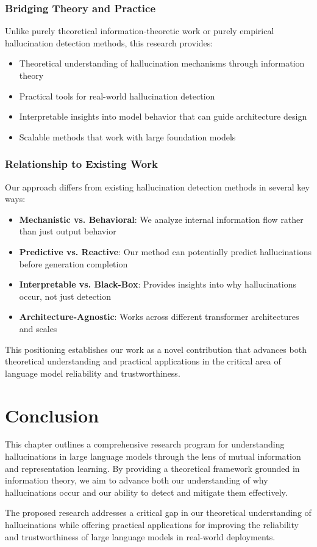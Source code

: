 \subsubsection{Bridging Theory and Practice}
Unlike purely theoretical information-theoretic work or purely empirical hallucination detection methods, this research provides:
\begin{itemize}
    \item Theoretical understanding of hallucination mechanisms through information theory
    \item Practical tools for real-world hallucination detection
    \item Interpretable insights into model behavior that can guide architecture design
    \item Scalable methods that work with large foundation models
\end{itemize}

\subsubsection{Relationship to Existing Work}
Our approach differs from existing hallucination detection methods in several key ways:
\begin{itemize}
    \item \textbf{Mechanistic vs. Behavioral}: We analyze internal information flow rather than just output behavior
    \item \textbf{Predictive vs. Reactive}: Our method can potentially predict hallucinations before generation completion
    \item \textbf{Interpretable vs. Black-Box}: Provides insights into why hallucinations occur, not just detection
    \item \textbf{Architecture-Agnostic}: Works across different transformer architectures and scales
\end{itemize}

This positioning establishes our work as a novel contribution that advances both theoretical understanding and practical applications in the critical area of language model reliability and trustworthiness.

\section{Conclusion}
\label{sec:hall_conclusion}

This chapter outlines a comprehensive research program for understanding hallucinations in large language models through the lens of mutual information and representation learning. By providing a theoretical framework grounded in information theory, we aim to advance both our understanding of why hallucinations occur and our ability to detect and mitigate them effectively.

The proposed research addresses a critical gap in our theoretical understanding of hallucinations while offering practical applications for improving the reliability and trustworthiness of large language models in real-world deployments.
